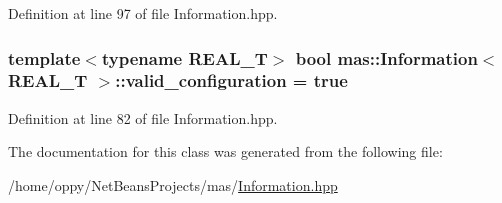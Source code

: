 Definition at line 97 of file Information.\-hpp.

\hypertarget{classmas_1_1_information_a5205ee6cc8165f1bf1feb30c6332fbb9}{
\subsubsection[{valid\-\_\-configuration}]{\setlength{\rightskip}{0pt plus 5cm}template$<$typename R\-E\-A\-L\-\_\-\-T$>$ bool {\bf mas\-::\-Information}$<$ R\-E\-A\-L\-\_\-\-T $>$\-::valid\-\_\-configuration = true}}\label{classmas_1_1_information_a5205ee6cc8165f1bf1feb30c6332fbb9}


Definition at line 82 of file Information.\-hpp.



The documentation for this class was generated from the following file\-:\begin{DoxyCompactItemize}
\item 
/home/oppy/\-Net\-Beans\-Projects/mas/\hyperlink{_information_8hpp}{Information.\-hpp}\end{DoxyCompactItemize}
